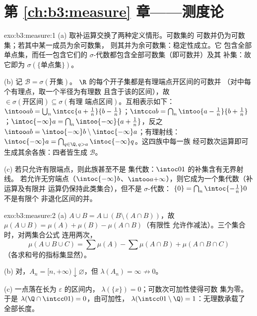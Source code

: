 \section*{第 \ref{ch:b3:measure} 章——测度论}

\begin{solution}{exo:b3:measure:1}
(a) 取补运算交换了两种定义情形。可数集的
可数并仍为可数集；若其中某一成员为余可数集，
则其并为余可数集：稳定性成立。它
包含全部单点集，而任一包含它们的
$\sigma$-代数都包含全部可数集（即可数并）及其
补集：故它即为 $\sigma(\{\text{单点集}\})$。

(b) 记 $\mathcal B = \sigma(\text{开集})$。
$\R$ 的每个开子集都是有理端点开区间的可数并
（对中每个有理点，取一个半径为有理数
且含于该的区间），故 $\in
\sigma(\text{开区间}) \subseteq \sigma(\text{有理
端点区间})$。互相表示如下：$\intoo ab = \bigcup_n\intcc{a +
\frac1n}{b - \frac1n}$；$\intcc ab = \bigcap_n \intoo{a -
\frac1n}{b + \frac1n}$；$\intoc{-\infty}a = \bigcap_n
\intoo{-\infty}{a + \frac1n}$，反之 $\intoo ab =
\intoo{-\infty}b \setminus \intoc{-\infty}a$；有理射线：
$\intoc{-\infty}a =
\bigcap_{q \in \Q,\, q > a}\intoc{-\infty}q$。这四族中每一族
经可数次运算即可生成其余各族：四者皆生成
$\mathcal B$。

(c) 若只允许有限端点，则此族甚至不是
集代数：$\intoc01$ 的补集含有无界射线。
若允许无穷端点（$\intoc{-\infty}b$、$\intoo
a{+\infty}$），则它成为一个集代数（补运算及有限并
运算仍保持此类集合），但不是 $\sigma$-代数：
$\{0\} = \bigcap_n\intoc{-\frac1n}0$ 不是有限个
非退化区间的并。
\end{solution}

\begin{solution}{exo:b3:measure:2}
(a) $A \cup B = A \sqcup (B \setminus (A\cap B))$，故
$\mu(A\cup B) = \mu(A) + \mu(B) - \mu(A\cap B)$（有限性
允许作减法）。三个集合时，对两集合公式
连用两次，
\[
\mu(A\cup B\cup C) = \sum\mu(A) - \sum\mu(A\cap B) +
\mu(A\cap B\cap C)
\]
（各求和号的指标集显然）。

(b) 对，$A_n = [n, +\infty) \downarrow
\varnothing$，但 $\lambda(A_n) = \infty \not\to 0$。

(c) 一点落在长为 $\varepsilon$ 的区间内，
$\lambda(\{x\}) = 0$；可数次可加性使得可数
集为零。于是 $\lambda(\Q \cap \intcc01) = 0$，由可加性，
$\lambda(\intcc01\setminus\Q) = 1$：无理数承载了
全部长度。
\end{solution}

